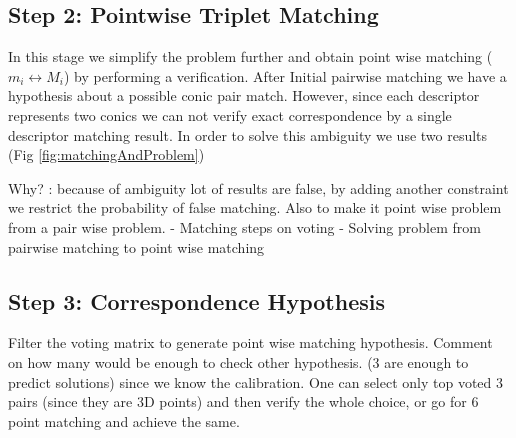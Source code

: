 \documentclass{bmvc2k}
\begin{document}
\subsection{Step 2: Pointwise Triplet Matching}
In this stage we simplify the problem further and obtain point wise matching ($ m_i \leftrightarrow M_i $) by performing a verification. After Initial pairwise matching we have a hypothesis about a possible conic pair match. However, since each descriptor represents two conics we can not verify exact correspondence by a single descriptor matching result. In order to solve this ambiguity we use two results (Fig \ref{fig:matchingAndProblem})   



Why? : because of ambiguity lot of results are false, by adding another constraint we restrict the probability of false matching. Also to make it point wise problem from a pair wise problem. 
- Matching steps on voting 
- Solving problem from pairwise matching to point wise matching
\subsection{Step 3: Correspondence Hypothesis }
Filter the voting matrix to generate point wise matching hypothesis. 
Comment on how many would be enough to check other hypothesis. 
(3 are enough to predict solutions) since we know the calibration. 
One can select only top voted 3 pairs (since they are 3D points) and then verify the whole choice, or go for 6 point matching and achieve the same.


\end{document}
